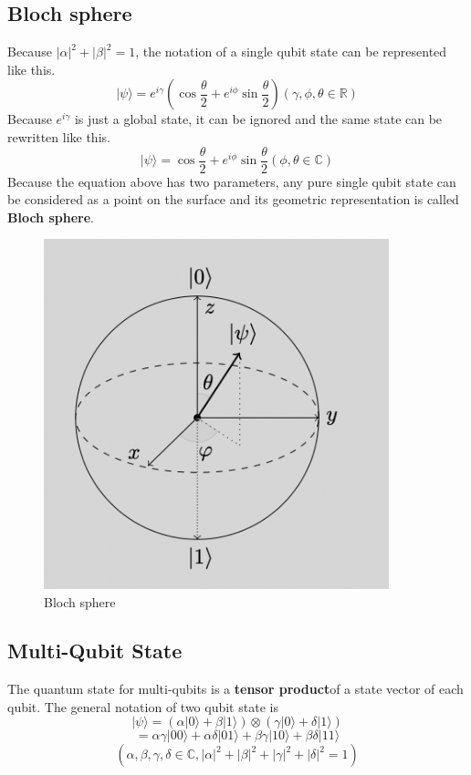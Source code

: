  \subsection{Bloch sphere}
 	Because $|\alpha|^2 + |\beta|^2 = 1$, the notation of a single qubit state can be represented like this.
	$$ |\psi\rangle = e^{i\gamma} (\cos{\frac{\theta}{2}} + e^{i\phi} \sin{\frac{\theta}{2}}) (\gamma, \phi, \theta \in \mathbb{R})$$ 
	Because $e^{i\gamma}$ is just a global state, it can be ignored and the same state can be rewritten like this.
	$$ |\psi\rangle =  \cos{\frac{\theta}{2}} + e^{i\phi} \sin{\frac{\theta}{2}} (\phi, \theta \in \mathbb{C})$$ 
	Because the equation above has two parameters,  any pure single qubit state can be considered as a point on the surface and its geometric representation is called \textbf{Bloch sphere}.
	\begin{figure}[h]
		\begin{center}
		\includegraphics[width=10cm]{img/blochsphere.png}
		\end{center}
		\caption{Bloch sphere}
	\end{figure}
	
 \subsection{Multi-Qubit State}
  The quantum state for multi-qubits is a \textbf{tensor product}of a state vector of each qubit.  The general notation of two qubit state is
   $$ |\psi\rangle = (\alpha |0\rangle + \beta |1\rangle) \otimes  (\gamma |0\rangle + \delta |1\rangle) $$
   $$ = \alpha \gamma |00\rangle + \alpha \delta |01\rangle + \beta \gamma |10\rangle + \beta \delta |11\rangle $$
  $$(\alpha, \beta, \gamma, \delta \in \mathbb{C}, |\alpha|^2+|\beta|^2+|\gamma|^2+|\delta|^2=1)$$
  
